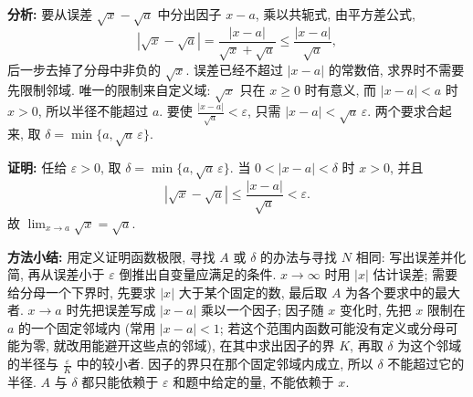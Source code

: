 \documentclass[UTF8,openany]{ctexbook}
\theoremstyle{chinesetextbook}
\newenvironment{cnproof}{\par\indent\textbf{证明:} \ignorespaces}{\par}
\begin{document}
\par\indent\textbf{分析:} 要从误差 $\sqrt x-\sqrt a$ 中分出因子 $x-a$, 乘以共轭式, 由平方差公式,
\[
|\sqrt x-\sqrt a|=\frac{|x-a|}{\sqrt x+\sqrt a}\le\frac{|x-a|}{\sqrt a},
\]
后一步去掉了分母中非负的 $\sqrt x$. 误差已经不超过 $|x-a|$ 的常数倍, 求界时不需要先限制邻域. 唯一的限制来自定义域: $\sqrt x$ 只在 $x\ge0$ 时有意义, 而 $|x-a|<a$ 时 $x>0$, 所以半径不能超过 $a$. 要使 $\displaystyle\frac{|x-a|}{\sqrt a}<\varepsilon$, 只需 $|x-a|<\sqrt a\,\varepsilon$. 两个要求合起来, 取 $\delta=\min\{a,\sqrt a\,\varepsilon\}$.
\begin{cnproof}
任给 $\varepsilon>0$, 取 $\delta=\min\{a,\sqrt a\,\varepsilon\}$. 当 $0<|x-a|<\delta$ 时 $x>0$, 并且
\[
|\sqrt x-\sqrt a|\le\frac{|x-a|}{\sqrt a}<\varepsilon.
\]
故 $\displaystyle\lim_{x\to a}\sqrt x=\sqrt a$.
\end{cnproof}
\par\indent\textbf{方法小结:} 用定义证明函数极限, 寻找 $A$ 或 $\delta$ 的办法与寻找 $N$ 相同: 写出误差并化简, 再从误差小于 $\varepsilon$ 倒推出自变量应满足的条件. $x\to\infty$ 时用 $|x|$ 估计误差; 需要给分母一个下界时, 先要求 $|x|$ 大于某个固定的数, 最后取 $A$ 为各个要求中的最大者. $x\to a$ 时先把误差写成 $|x-a|$ 乘以一个因子; 因子随 $x$ 变化时, 先把 $x$ 限制在 $a$ 的一个固定邻域内 (常用 $|x-a|<1$; 若这个范围内函数可能没有定义或分母可能为零, 就改用能避开这些点的邻域), 在其中求出因子的界 $K$, 再取 $\delta$ 为这个邻域的半径与 $\displaystyle\frac\varepsilon K$ 中的较小者. 因子的界只在那个固定邻域内成立, 所以 $\delta$ 不能超过它的半径. $A$ 与 $\delta$ 都只能依赖于 $\varepsilon$ 和题中给定的量, 不能依赖于 $x$.
\end{document}
